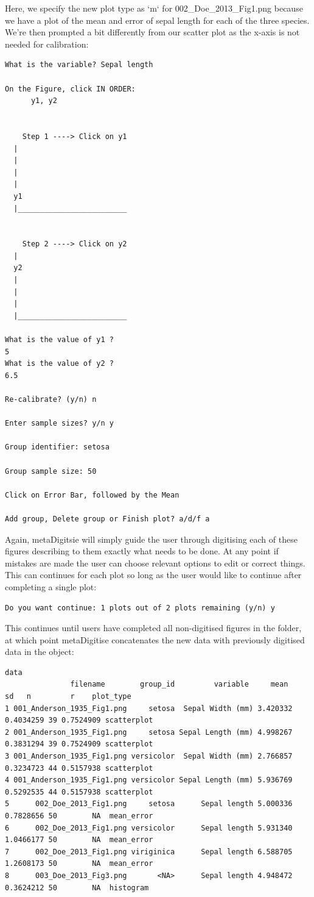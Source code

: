\documentclass{article}
\begin{document}
Here, we specify the new plot type as `m` for 002\_Doe\_2013\_Fig1.png because we have a plot of the mean and error of sepal length for each of the three species. We're then prompted a bit differently from our scatter plot as the x-axis is not needed for calibration:

\begin{lstlisting}
What is the variable? Sepal length

On the Figure, click IN ORDER: 
      y1, y2  


    Step 1 ----> Click on y1
  |
  |
  |
  |
  y1
  |_________________________


    Step 2 ----> Click on y2
  |
  y2
  |
  |
  |
  |_________________________
  
What is the value of y1 ?
5
What is the value of y2 ?
6.5

Re-calibrate? (y/n) n

Enter sample sizes? y/n y

Group identifier: setosa

Group sample size: 50

Click on Error Bar, followed by the Mean

Add group, Delete group or Finish plot? a/d/f a
\end{lstlisting}
Again, metaDigitsie will simply guide the user through digitising each of these figures describing to them exactly what needs to be done. At any point if mistakes are made the user can choose relevant options to edit or correct things. This can continues for each plot so long as the user would like to continue after completing a single plot:

\begin{lstlisting}
Do you want continue: 1 plots out of 2 plots remaining (y/n) y
\end{lstlisting}

This continues until users have completed all non-digitised figures in the folder, at which point metaDigitise concatenates the new data with previously digitised data in the object:

\begin{lstlisting}
data
               filename        group_id         variable     mean        sd   n         r    plot_type
1 001_Anderson_1935_Fig1.png     setosa  Sepal Width (mm) 3.420332 0.4034259 39 0.7524909 scatterplot
2 001_Anderson_1935_Fig1.png     setosa Sepal Length (mm) 4.998267 0.3831294 39 0.7524909 scatterplot
3 001_Anderson_1935_Fig1.png versicolor  Sepal Width (mm) 2.766857 0.3234723 44 0.5157938 scatterplot
4 001_Anderson_1935_Fig1.png versicolor Sepal Length (mm) 5.936769 0.5292535 44 0.5157938 scatterplot
5      002_Doe_2013_Fig1.png     setosa      Sepal length 5.000336 0.7828656 50        NA  mean_error
6      002_Doe_2013_Fig1.png versicolor      Sepal length 5.931340 1.0466177 50        NA  mean_error
7      002_Doe_2013_Fig1.png viriginica      Sepal length 6.588705 1.2608173 50        NA  mean_error
8      003_Doe_2013_Fig3.png       <NA>      Sepal length 4.948472 0.3624212 50        NA  histogram
\end{lstlisting}
\end{document}
